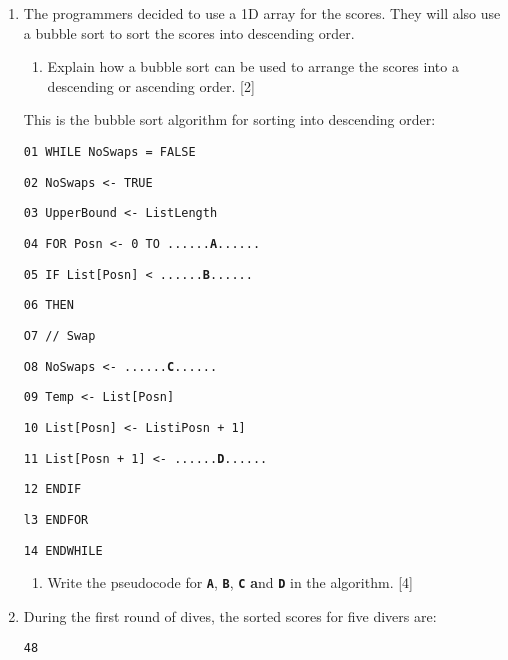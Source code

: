 \begin{enumerate}
\item The programmers decided to use a 1D array for the scores. They will
also use a bubble sort to sort the scores into descending order.
\begin{enumerate}
\item Explain how a bubble sort can be used to arrange the scores into a
descending or ascending order. \hfill{}{[}2{]}
\end{enumerate}
This is the bubble sort algorithm for sorting into descending order:

\noindent\begin{minipage}[t]{1\columnwidth}%
\texttt{01 WHILE NoSwaps = FALSE}

\texttt{02 \qquad{}NoSwaps <- TRUE}

\texttt{03 \qquad{}UpperBound <- ListLength}

\texttt{04 \qquad{}FOR Posn <- 0 TO ......}\texttt{\textbf{A}}\texttt{......}

\texttt{05 \qquad{}\qquad{}IF List{[}Posn{]} < ......}\texttt{\textbf{B}}\texttt{......}

\texttt{06 \qquad{}\qquad{}\qquad{}THEN}

\texttt{O7 \qquad{}\qquad{}\qquad{}\qquad{}// Swap}

\texttt{O8 \qquad{}\qquad{}\qquad{}\qquad{}NoSwaps <- ......}\texttt{\textbf{C}}\texttt{......}

\texttt{09 \qquad{}\qquad{}\qquad{}\qquad{}Temp <- List{[}Posn{]}}

\texttt{10 \qquad{}\qquad{}\qquad{}\qquad{}List{[}Posn{]} <- ListiPosn
+ 1{]}}

\texttt{11 \qquad{}\qquad{}\qquad{}\qquad{}List{[}Posn + 1{]}
<- ......}\texttt{\textbf{D}}\texttt{......}

\texttt{12 \qquad{}\qquad{}ENDIF}

\texttt{l3 \qquad{}ENDFOR}

\texttt{14 ENDWHILE}%
\end{minipage}
\begin{enumerate}
\item Write the pseudocode for \texttt{\textbf{A}}, \texttt{\textbf{B}},
\texttt{\textbf{C}}\textbf{ a}nd \texttt{\textbf{D}} in the algorithm.
\hfill{} {[}4{]}
\end{enumerate}
\item During the first round of dives, the sorted scores for five divers
are: 

\texttt{48 }


\end{enumerate}
